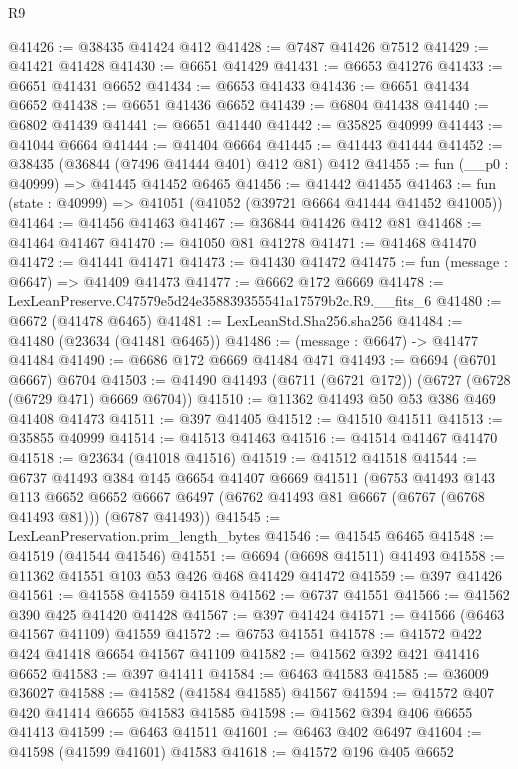 \begin{lexlean}{R9}
\begin{coremodule}
@41426 := @38435 @41424 @412
@41428 := @7487 @41426 @7512
@41429 := @41421 @41428
@41430 := @6651 @41429
@41431 := @6653 @41276
@41433 := @6651 @41431 @6652
@41434 := @6653 @41433
@41436 := @6651 @41434 @6652
@41438 := @6651 @41436 @6652
@41439 := @6804 @41438
@41440 := @6802 @41439
@41441 := @6651 @41440
@41442 := @35825 @40999
@41443 := @41044 @6664
@41444 := @41404 @6664
@41445 := @41443 @41444
@41452 := @38435 (@36844 (@7496 @41444 @401) @412 @81) @412
@41455 := fun (__p0 : @40999) => @41445 @41452 @6465
@41456 := @41442 @41455
@41463 := fun (state : @40999) => @41051 (@41052 (@39721 @6664 @41444 @41452 @41005))
@41464 := @41456 @41463
@41467 := @36844 @41426 @412 @81
@41468 := @41464 @41467
@41470 := @41050 @81 @41278
@41471 := @41468 @41470
@41472 := @41441 @41471
@41473 := @41430 @41472
@41475 := fun (message : @6647) => @41409 @41473
@41477 := @6662 @172 @6669
@41478 := LexLeanPreserve.C47579e5d24e358839355541a17579b2c.R9.__fits_6
@41480 := @6672 (@41478 @6465)
@41481 := LexLeanStd.Sha256.sha256
@41484 := @41480 (@23634 (@41481 @6465))
@41486 := (message : @6647) -> @41477 @41484
@41490 := @6686 @172 @6669 @41484 @471
@41493 := @6694 (@6701 @6667) @6704
@41503 := @41490 @41493 (@6711 (@6721 @172)) (@6727 (@6728 (@6729 @471) @6669 @6704))
@41510 := @11362 @41493 @50 @53 @386 @469 @41408 @41473
@41511 := @397 @41405
@41512 := @41510 @41511
@41513 := @35855 @40999
@41514 := @41513 @41463
@41516 := @41514 @41467 @41470
@41518 := @23634 (@41018 @41516)
@41519 := @41512 @41518
@41544 := @6737
    @41493
    @384
    @145
    @6654
    @41407
    @6669
    @41511
    (@6753
      @41493
      @143
      @113
      @6652
      @6652
      @6667
      @6497
      (@6762 @41493 @81 @6667 (@6767 (@6768 @41493 @81)))
      (@6787 @41493))
@41545 := LexLeanPreservation.prim_length_bytes
@41546 := @41545 @6465
@41548 := @41519 (@41544 @41546)
@41551 := @6694 (@6698 @41511) @41493
@41558 := @11362 @41551 @103 @53 @426 @468 @41429 @41472
@41559 := @397 @41426
@41561 := @41558 @41559 @41518
@41562 := @6737 @41551
@41566 := @41562 @390 @425 @41420 @41428
@41567 := @397 @41424
@41571 := @41566 (@6463 @41567 @41109) @41559
@41572 := @6753 @41551
@41578 := @41572 @422 @424 @41418 @6654 @41567 @41109
@41582 := @41562 @392 @421 @41416 @6652
@41583 := @397 @41411
@41584 := @6463 @41583
@41585 := @36009 @36027
@41588 := @41582 (@41584 @41585) @41567
@41594 := @41572 @407 @420 @41414 @6655 @41583 @41585
@41598 := @41562 @394 @406 @6655 @41413
@41599 := @6463 @41511
@41601 := @6463 @402 @6497
@41604 := @41598 (@41599 @41601) @41583
@41618 := @41572
    @196
    @405
    @6652

\end{coremodule}
\end{lexlean}
